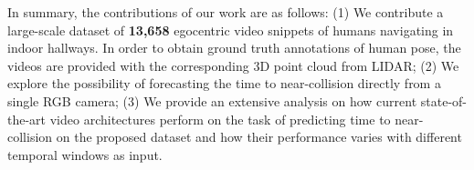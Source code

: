 In summary, the contributions of our work are as follows: (1) We contribute a large-scale dataset of \textbf{13,658} egocentric video snippets of humans navigating in indoor hallways. In order to obtain ground truth annotations of human pose, the videos are provided with the corresponding 3D point cloud from LIDAR; (2) We explore the possibility of forecasting the time to near-collision directly from a single RGB camera; (3) We provide an extensive analysis on how current state-of-the-art video architectures perform on the task of predicting time to near-collision on the proposed dataset and how their performance varies with different temporal windows as input.